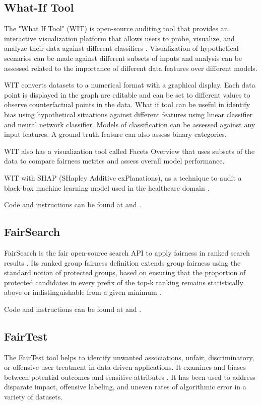 \documentclass[conference]{IEEEtran}
\begin{document}
\subsection{What-If Tool}
The "What If Tool" (WIT) is open-source auditing tool that provides an interactive visualization platform that allows users to probe, visualize, and analyze their data against different classifiers \cite{b27}.  Visualization of hypothetical scenarios can be made against different subsets of inputs and analysis can be assessed related to the importance of different data features over different models.

WIT converts datasets to a numerical format with a graphical display. Each data point is displayed in the graph are editable and can be set to different values to observe counterfactual points in the data. 
What if tool can be useful in identify bias using hypothetical situations against different features using linear classifier and neural network classifier. Models of classification can be assessed against any input features. A ground truth feature can also assess binary categories.

WIT also has a visualization tool called Facets Overview \cite{b28} that uses subsets of the data to compare fairness metrics and assess overall model performance.

WIT with SHAP (SHapley Additive exPlanations)\cite{b29}, as a technique to audit a black-box machine learning model used in the healthcare domain \cite{b30}.

Code and instructions can be found at \cite{b31} and \cite{b32}.

\subsection{FairSearch}
FairSearch is the fair open-source search API to apply fairness in ranked search results \cite{b33}.
Its ranked group fairness definition extends group fairness using the standard notion of protected groups, based on ensuring that the proportion of protected candidates in every prefix of the top-k ranking remains statistically above or indistinguishable from a given minimum \cite{b34}.

Code and instructions can be found at \cite{b35} and \cite{b36}.

\subsection{FairTest}
The FairTest tool helps to identify unwanted associations, unfair, discriminatory, or offensive user treatment in data-driven applications. It examines and biases between potential outcomes and sensitive attributes \cite{b37}. It has been used to address disparate impact, offensive labeling, and uneven
rates of algorithmic error in a variety of datasets.
\end{document}

